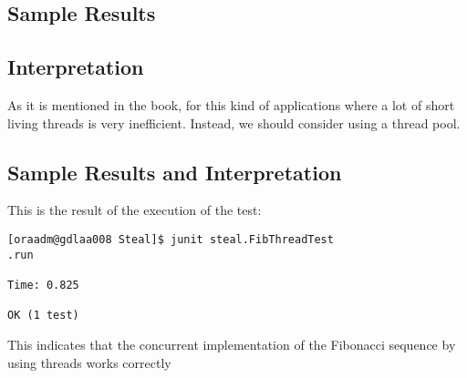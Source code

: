 \subsection{Sample Results}
\par
\par
\subsection{Interpretation}
\par
As it is mentioned in the book, for this kind of applications where a lot of
short living threads is very inefficient. Instead, we should consider using a
thread pool.
\par
\subsection{Sample Results and Interpretation}
\par
This is the result of the execution of the test:
\par
\hfill
\begin{verbatim}
[oraadm@gdlaa008 Steal]$ junit steal.FibThreadTest
.run

Time: 0.825

OK (1 test)
\end{verbatim}
\hfill
\par
This indicates that the concurrent implementation of the Fibonacci sequence by
using threads works correctly
